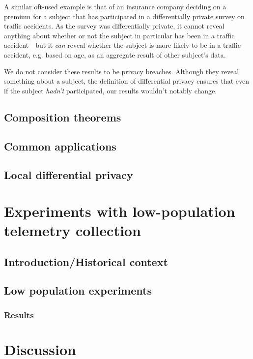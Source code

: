 A similar oft-used example is that of an insurance company deciding on a premium for a subject that has participated in a differentially private survey on traffic accidents. As the survey was differentially private, it cannot reveal anything about whether or not the subject in particular has been in a traffic accident---but it \emph{can} reveal whether the subject is more likely to be in a traffic accident, e.g. based on age, as an aggregate result of other subject's data.

We do not consider these results to be privacy breaches. Although they reveal something about a subject, the definition of differential privacy ensures that even if the subject \emph{hadn't} participated, our results wouldn't notably change. 

\subsection{Composition theorems}

\subsection{Common applications}

\subsection{Local differential privacy}

\section{Experiments with low-population telemetry collection}

\subsection{Introduction/Historical context}

\subsection{Low population experiments}

\subsubsection{Results}

\section{Discussion}



